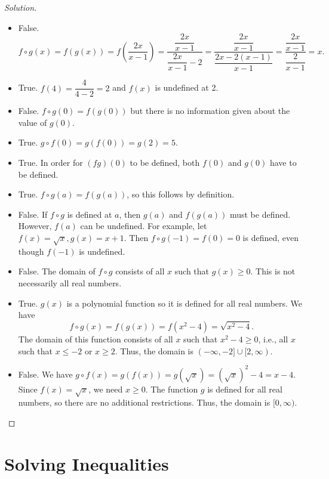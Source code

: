 \documentclass[12pt]{article}
\newenvironment{solution}{\begin{proof}[Solution]}{\end{proof}}
\begin{document}
\begin{enumerate}
		\begin{solution}
			\begin{itemize}
				\item[(a)] False. $$f\circ g(x)=f(g(x))=f\left(\dfrac{2x}{x-1}\right)=\dfrac{\dfrac{2x}{x-1}}{\dfrac{2x}{x-1}-2}=\dfrac{\dfrac{2x}{x-1}}{\dfrac{2x-2(x-1)}{x-1}}=\dfrac{\dfrac{2x}{x-1}}{\dfrac{2}{x-1}}=x.$$
				\item[(b)] True. $f(4)=\dfrac{4}{4-2}=2$ and $f(x)$ is undefined at 2.
				\item[(c)] False. $f\circ g (0)=f(g(0))$ but there is no information given about the value of $g(0)$.
				\item[(d)] True. $g\circ f(0)=g(f(0))=g(2)=5$.
				\item[(e)] True. In order for $(fg)(0)$ to be defined, both $f(0)$ and $g(0)$ have to be defined.
				\item[(f)] True. $f\circ g(a)=f(g(a))$, so this follows by definition.
				\item[(g)] False. If $f\circ g$ is defined at $a$, then $g(a)$ and $f(g(a))$ must be defined. However, $f(a)$ can be undefined. For example, let $f(x)=\sqrt{x},g(x)=x+1$. Then
				$f\circ g(-1)=f(0)=0$
				is defined, even though $f(-1)$ is undefined.
				\item[(h)] False. The domain of $f\circ g$ consists of all $x$ such that $g(x)\geq 0$. This is not necessarily all real numbers.
				\item[(i)] True. $g(x)$ is a polynomial function so it is defined for all real numbers. We have 
				$$f\circ g(x)=f(g(x))=f(x^2-4)=\sqrt{x^2-4}.$$
				The domain of this function consists of all $x$ such that $x^2-4\geq 0$, i.e., all $x$ such that $x\leq -2$ or $x\geq 2$. Thus, the domain is $(-\infty,-2]\cup[2,\infty)$.
				\item[(j)] False. We have $g\circ f(x)=g(f(x))
				=g(\sqrt{x})=(\sqrt{x})^2-4=x-4$.
				Since $f(x)=\sqrt{x}$, we need $x\geq0$.
				The function $g$ is defined for all real numbers, so there are no additional restrictions. Thus, the domain is $[0,\infty)$.
			\end{itemize}
		\end{solution}
		
	\end{enumerate}
	
	\newpage
	\section{Solving Inequalities}
	
\end{document}
